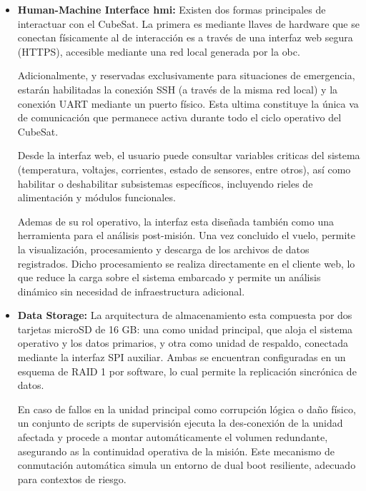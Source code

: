 \begin{itemize}
      \item \textbf{Human-Machine Interface \acrshort{hmi}:} Existen dos formas principales de interactuar con
        el CubeSat. La primera es mediante llaves de hardware que se conectan físicamente al
        de interacción es a través de una interfaz web segura (HTTPS), accesible mediante una
        red local generada por la \acrshort{obc}.

        Adicionalmente, y reservadas exclusivamente para situaciones de emergencia, estarán
        habilitadas la conexión SSH (a través de la misma red local) y la conexión UART
        mediante un puerto físico. Esta ultima constituye la única va de comunicación que
        permanece activa durante todo el ciclo operativo del CubeSat.

        Desde la interfaz web, el usuario puede consultar variables criticas del sistema (temperatura, voltajes,
        corrientes, estado de sensores, entre otros), así como habilitar o
        deshabilitar subsistemas específicos, incluyendo rieles de alimentación y módulos funcionales.

        Ademas de su rol operativo, la interfaz esta diseñada también como una herramienta
        para el análisis post-misión. Una vez concluido el vuelo, permite la visualización, procesamiento
        y descarga de los archivos de datos registrados. Dicho procesamiento se realiza
        directamente en el cliente web, lo que reduce la carga sobre el sistema embarcado y
        permite un análisis dinámico sin necesidad de infraestructura adicional.

      \item \textbf{Data Storage:} La arquitectura de almacenamiento esta compuesta por dos tarjetas
        microSD de 16 GB: una como unidad principal, que aloja el sistema operativo y los
        datos primarios, y otra como unidad de respaldo, conectada mediante la interfaz SPI
        auxiliar. Ambas se encuentran configuradas en un esquema de RAID 1 por software,
        lo cual permite la replicación sincrónica de datos.

        En caso de fallos en la unidad principal
        como corrupción lógica o daño físico, un conjunto de scripts de supervisión ejecuta
        la des-conexión de la unidad afectada y procede a montar automáticamente el volumen
        redundante, asegurando as la continuidad operativa de la misión. Este mecanismo de
        conmutación automática simula un entorno de dual boot resiliente, adecuado para
        contextos de riesgo.


\end{itemize}
